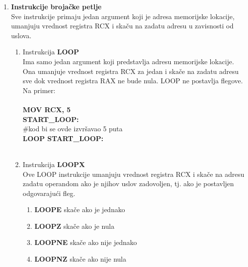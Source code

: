 \documentclass[a4paper]{article}
\begin{document}
\begin{enumerate}
\item{\textbf{Instrukcije broja\v cke petlje}}\\
Sve instrukcije primaju jedan argument koji je adresa memorijske lokacije, umanjuju vrednost 
registra RCX i ska\v cu na zadatu adresu u zavisnosti od uslova.
\begin{enumerate}

\item{Instrukcija \textbf{LOOP}} \\
	Ima samo jedan argument koji predstavlja adresu memorijske lokacije.
	Ona umanjuje vrednost registra RCX za jedan i ska\v ce na zadatu adresu sve dok vrednost registra RAX ne bude nula.
	LOOP ne postavlja flegove. Na primer: \\ \\
	
	\textbf{MOV RCX, 5} \\
	\textbf{START\_LOOP:} \\
	\#kod bi se ovde izvr\v savao 5 puta\\
	\textbf{LOOP START\_LOOP:} \\ \\

\item{Instrukcija \textbf{LOOPX}}\\
	Ove LOOP instrukcije umanjuju vrednost registra RCX i ska\v ce na adresu zadatu operandom
	ako je njihov uslov zadovoljen, tj. ako je postavljen odgovaraju\' ci fleg.
	\begin{enumerate}
	\item{\textbf{LOOPE}} ska\v ce ako je jednako
	\item{\textbf{LOOPZ}} ska\v ce ako je nula
	\item{\textbf{LOOPNE}} ska\v ce ako nije jednako
	\item{\textbf{LOOPNZ}} ska\v ce ako nije nula
	\end{enumerate}
\end{enumerate} %



\end{enumerate}
\end{document}
